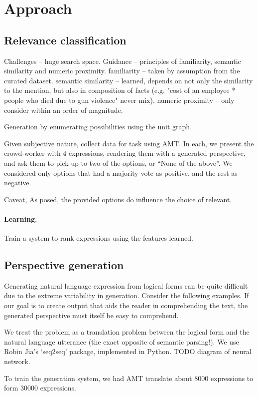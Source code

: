\section{Approach}

\subsection{Relevance classification}

Challenges -- huge search space.
Guidance -- principles of familiarity, semantic similarity and numeric proximity.
familiarity -- taken by assumption from the curated dataset.
semantic similarity -- learned, depends on not only the similarity to the mention, but also in composition of facts (e.g. "cost of an employee * people who died due to gun violence" never mix).
numeric proximity -- only consider within an order of magnitude. 

Generation by enumerating possibilities using the unit graph.

Given subjective nature, collect data for task using AMT.\@
In each, we present the crowd-worker with 4 expressions, rendering them with a generated perspective, and ask them to pick up to two of the options, or ``None of the above''. 
We considered only options that had a majority vote as positive, and the rest as negative.

Caveat, As posed, the provided options do influence the choice of relevant.

\paragraph{Learning.}
Train a system to rank expressions using the features learned.

\subsection{Perspective generation}

Generating natural language expression from logical forms can be quite difficult due to the extreme variability in generation.
Consider the following examples.
If our goal is to create output that aids the reader in comprehending the text, the generated perspective must itself be easy to comprehend.

We treat the problem as a translation problem between the logical form and the natural language utterance (the exact opposite of semantic parsing!).
We use Robin Jia's `seq2seq' package, implemented in Python.
TODO diagram of neural network.

To train the generation system, we had AMT translate about 8000 expressions to form 30000 expressions.

